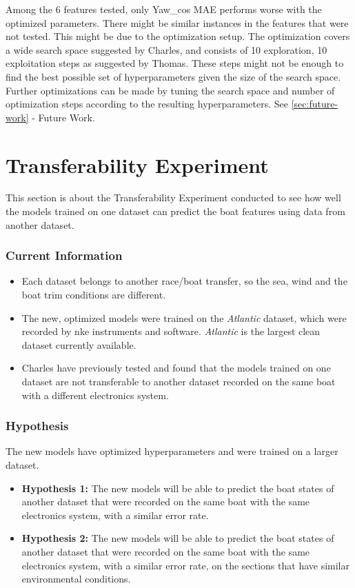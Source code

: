 \documentclass[12pt,twoside]{report}
\begin{document}
Among the 6 features tested, only Yaw\_cos MAE performs worse with the optimized parameters. There might be similar instances in the features that were not tested. This might be due to the optimization setup. The optimization covers a wide search space suggested by Charles, and consists of 10 exploration, 10 exploitation steps as suggested by Thomas. These steps might not be enough to find the best possible set of hyperparameters given the size of the search space. Further optimizations can be made by tuning the search space and number of optimization steps according to the resulting hyperparameters. See \ref{sec:future-work} - Future Work.


\section{Transferability Experiment} \label{section:transferability}

This section is about the Transferability Experiment conducted to see how well the models trained on one dataset can predict the boat features using data from another dataset.

\subsubsection{Current Information}
\begin{itemize}
  \item Each dataset belongs to another race/boat transfer, so the sea, wind and the boat trim conditions are different.
  \item The new, optimized models were trained on the \textit{Atlantic} dataset, which were recorded by nke instruments and software. \textit{Atlantic} is the largest clean dataset currently available.
  \item Charles have previously tested and found that the models trained on one dataset are not transferable to another dataset recorded on the same boat with a different electronics system.
\end{itemize}

\subsubsection{Hypothesis}
The new models have optimized hyperparameters and were trained on a larger dataset.
\begin{itemize}
  \item \textbf{Hypothesis 1:} The new models will be able to predict the boat states of another dataset that were recorded on the same boat with the same electronics system, with a similar error rate.
  \item \textbf{Hypothesis 2:} The new models will be able to predict the boat states of another dataset that were recorded on the same boat with the same electronics system, with a similar error rate, on the sections that have similar environmental conditions.
\end{itemize}
\end{document}
